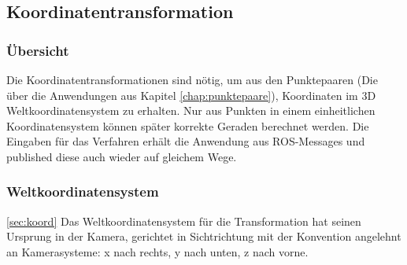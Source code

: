 \subsection{Koordinatentransformation}
\subsubsection{Übersicht}
Die Koordinatentransformationen sind nötig, um aus den Punktepaaren (Die über die Anwendungen aus Kapitel \ref{chap:punktepaare}), Koordinaten im 3D Weltkoordinatensystem zu erhalten. Nur aus Punkten in einem einheitlichen Koordinatensystem können später korrekte Geraden berechnet werden.
Die Eingaben für das Verfahren erhält die Anwendung aus ROS-Messages und published diese auch wieder auf gleichem Wege.

\subsubsection{Weltkoordinatensystem}
\ref{sec:koord}
Das Weltkoordinatensystem für die Transformation hat seinen Ursprung in der Kamera, gerichtet in Sichtrichtung mit der Konvention angelehnt an Kamerasysteme: x nach rechts, y nach unten, z nach vorne.

